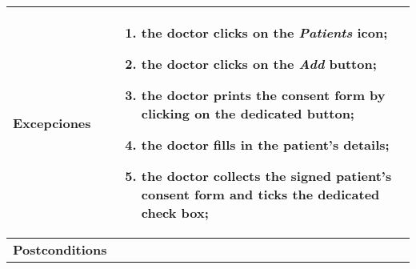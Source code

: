 \begin{longtable}{| p{3.5cm} | p{9cm} |}
\hline

\textbf{Excepciones} &\mbox{}\par\vspace{-\baselineskip}
\begin{enumerate}[leftmargin=0.7cm, topsep=0.1cm]
\item the doctor clicks on the \textit{Patients} icon;
\item the doctor clicks on the \textit{Add} button;
\item the doctor prints the consent form by clicking on the dedicated button;
\item the doctor fills in the patient's details;
\item the doctor collects the signed patient's consent form and ticks the dedicated check box;
\end{enumerate}\\

\hline

\textbf{Postconditions} & \\

\hline


\end{longtable}

